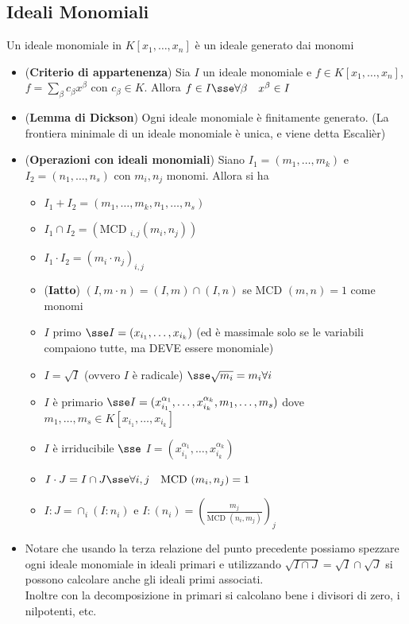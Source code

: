 \documentclass[a4paper,NoNotes,GeneralMath]{stdmdoc}
\newcommand{\MCD}{\text{MCD }}
\begin{document}
	\subsection*{Ideali Monomiali}
	Un ideale monomiale in $K[x_1, \ldots, x_n]$ è un ideale generato dai monomi
	\begin{itemize}
		\item ({\bf Criterio di appartenenza}) Sia $I$ un ideale monomiale e $f \in K[x_1, \ldots, x_n]$, $f = \sum_\beta c_\beta x^\beta$ con $c_\beta \in K$. Allora $f \in I \sse \forall \beta \quad x^\beta \in I$
		\item ({\bf Lemma di Dickson}) Ogni ideale monomiale è finitamente generato. (La frontiera minimale di un ideale monomiale è unica, e viene detta Escalièr)
		\item ({\bf Operazioni con ideali monomiali}) Siano $I_1 = (m_1, \ldots, m_k)$ e $I_2 = (n_1, \ldots, n_s)$ con $m_i, n_j$ monomi. Allora si ha
			\begin{itemize}
				\item $I_1 + I_2 = (m_1, \ldots, m_k, n_1, \ldots, n_s)$
				\item $I_1 \cap I_2 = (\MCD_{i,j} (m_i, n_j))$
				\item $I_1 \cdot I_2 = (m_i \cdot n_j)_{i,j}$
				\item ({\bf Iatto}) $(I, m \cdot n) = (I, m) \cap (I, n)$ se $\MCD(m, n) = 1$ come monomi
				\item $I$ primo $\sse I = (x_{i_1}, \ldots, x_{i_k})$ (ed è massimale solo se le variabili compaiono tutte, ma DEVE essere monomiale)
				\item $I = \sqrt{I}$ (ovvero $I$ è radicale) $\sse \sqrt{m_i} = m_i \forall i$
				\item $I$ è primario $\sse I = (x_{i_1}^{\alpha_1}, \ldots, x_{i_k}^{\alpha_k}, m_1, \ldots, m_s)$ dove $m_1, \ldots, m_s \in K[x_{i_1}, \ldots, x_{i_k}]$
				\item $I$ è irriducibile $\sse$ $I = (x_{i_1}^{\alpha_1}, \ldots, x_{i_k}^{\alpha_k})$
				\item $I\cdot J = I \cap J \sse \forall i,j \quad \MCD(m_i, n_j) = 1$
				\item $I : J = \cap_i (I : n_i)$ e $I : (n_i) = (\frac{m_j}{\MCD(n_i, m_j)})_{j}$
			\end{itemize}
		\item Notare che usando la terza relazione del punto precedente possiamo spezzare ogni ideale monomiale in ideali primari e utilizzando $\sqrt{I \cap J} = \sqrt{I} \cap \sqrt{J}$ si possono calcolare anche gli ideali primi associati. \\
			Inoltre con la decomposizione in primari si calcolano bene i divisori di zero, i nilpotenti, etc.
	\end{itemize}
	
\end{document}
